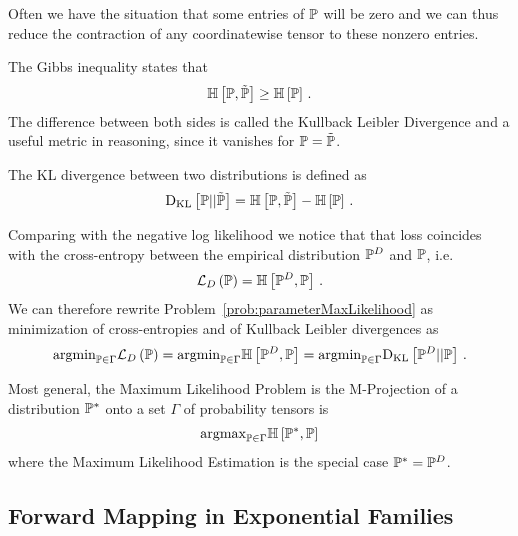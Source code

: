 Often we have the situation that some entries of $\mathbb{P}$ will be zero and we can thus reduce the contraction of any coordinatewise tensor to these nonzero entries. 

The Gibbs inequality states that
		\[ \mathbb{H}\left[\mathbb{P},\tilde{\mathbb{P}}\right] \geq \mathbb{H}\left[\mathbb{P}\right] \, . \]
The difference between both sides is called the Kullback Leibler Divergence and a useful metric in reasoning, since it vanishes for $\mathbb{P}=\tilde{\mathbb{P}}$.

\begin{definition}\label{def:KLDivergence}
	The KL divergence between two distributions is defined as 
		\[ \mathrm{D}_{\mathrm{KL}}\left[ \mathbb{P} || \tilde{\mathbb{P}} \right] = \mathbb{H}\left[\mathbb{P},\tilde{\mathbb{P}}\right] - \mathbb{H}\left[\mathbb{P}\right]  \, . \]
\end{definition}


Comparing with the negative log likelihood we notice that that loss coincides with the cross-entropy between the empirical distribution $\mathbb{P}^{D}$ and $\mathbb{P}$, i.e.
	\[ \mathcal{L}_{D}\left(\mathbb{P}\right) = \mathbb{H}\left[\mathbb{P}^{D},\mathbb{P}\right] \, . \]
We can therefore rewrite Problem~\ref{prob:parameterMaxLikelihood} as minimization of cross-entropies and of Kullback Leibler divergences as
\begin{align*}
	\mathrm{argmin}_{\mathbb{P}\in\Gamma} \mathcal{L}_{D}\left(\mathbb{P}\right) 
	= \mathrm{argmin}_{\mathbb{P}\in\Gamma} \mathbb{H}\left[\mathbb{P}^{D},\mathbb{P}\right] 
	= \mathrm{argmin}_{\mathbb{P}\in\Gamma} \mathrm{D}_{\mathrm{KL}}\left[ \mathbb{P}^{D} || \mathbb{P} \right] \, .
\end{align*}
	


Most general, the Maximum Likelihood Problem is the M-Projection of a distribution $\mathbb{P}^*$ onto a set $\Gamma$ of probability tensors is
\begin{align}
	\mathrm{argmax}_{\mathbb{P}\in\Gamma} \mathbb{H}\left[\mathbb{P}^*,\mathbb{P}\right] 
\end{align}
where the Maximum Likelihood Estimation is the special case $\mathbb{P}^*=\mathbb{P}^{D}$.





\subsection{Forward Mapping in Exponential Families} 


